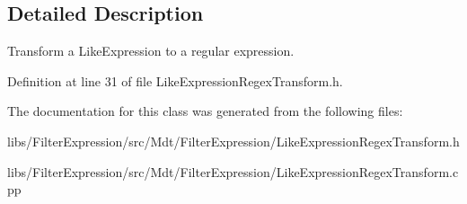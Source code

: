 \subsection{Detailed Description}
Transform a Like\+Expression to a regular expression. 

Definition at line 31 of file Like\+Expression\+Regex\+Transform.\+h.



The documentation for this class was generated from the following files\+:\begin{DoxyCompactItemize}
\item 
libs/\+Filter\+Expression/src/\+Mdt/\+Filter\+Expression/Like\+Expression\+Regex\+Transform.\+h\item 
libs/\+Filter\+Expression/src/\+Mdt/\+Filter\+Expression/Like\+Expression\+Regex\+Transform.\+cpp\end{DoxyCompactItemize}
